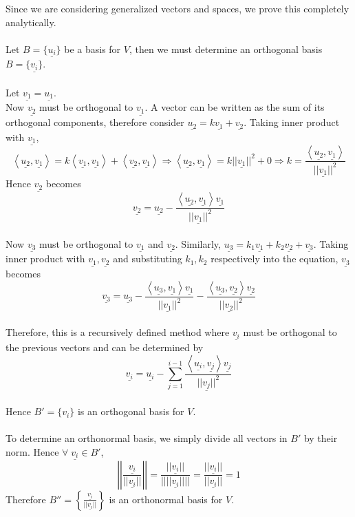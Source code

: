 \documentclass{article}
\begin{document}
\begin{tcolorbox}[colback=lightgray!20, colframe=lightgray!20, fontupper=\linespread{1.1}\selectfont]
	Since we are considering generalized vectors and spaces, we prove this completely analytically. \\\\	
	Let $B = \{\underline{u_i}\}$ be a basis for $V$, then we must determine an orthogonal basis $B = \{\underline{v_i}\}$. \\\\
	Let $\underline{v_1} = \underline{u_1}$. \\
	Now $\underline{v_2}$ must be orthogonal to $\underline{v_1}$. A vector can be written as the sum of its orthogonal components, therefore consider $\underline{u_2} = k\underline{v_1} + \underline{v_2}$. Taking inner product with $\underline{v_1}$,
	$$\left<\underline{u_2},\underline{v_1}\right> = k\left<\underline{v_1},\underline{v_1}\right> + \left<\underline{v_2},\underline{v_1}\right>
	\Rightarrow \left<\underline{u_2},\underline{v_1}\right> = k||\underline{v_1}||^2 + 0
	\Rightarrow k =  \frac{\left<\underline{u_2},\underline{v_1}\right>}{||\underline{v_1}||^2}$$
	Hence $\underline{v_2}$ becomes
	$$\underline{v_2} = \underline{u_2} - \frac{\left<\underline{u_2},\underline{v_1}\right> \underline{v_1}}{||\underline{v_1}||^2}$$ \\
	Now $\underline{v_3}$ must be orthogonal to $\underline{v_1}$ and $\underline{v_2}$. Similarly, $\underline{u_3} = k_1\underline{v_1} + k_2\underline{v_2} + \underline{v_3}$. Taking inner product with $\underline{v_1}, \underline{v_2}$ and substituting $k_1, k_2$ respectively into the equation, $\underline{v_3}$ becomes
	$$\underline{v_3} = \underline{u_3} - \frac{\left<\underline{u_3},\underline{v_1}\right> \underline{v_1}}{||\underline{v_1}||^2} - \frac{\left<\underline{u_3},\underline{v_2}\right> \underline{v_2}}{||\underline{v_2}||^2}$$ \\
	Therefore, this is a recursively defined method where $\underline{v_i}$ must be orthogonal to the previous vectors and can be determined by
	$$\underline{v_i} = \underline{u_i} - \sum_{j=1}^{i-1} \frac{\left<\underline{u_i}, \underline{v_j}\right> \underline{v_j}}{||\underline{v_j}||^2}$$ \\
	Hence $B' = \{v_i\}$ is an orthogonal basis for $V$. \\\\
	To determine an orthonormal basis, we simply divide all vectors in $B'$ by their norm. Hence $\forall \; \underline{v_i} \in B'$,
	$$\left|\left| \frac{\underline{v_i}}{||\underline{v_i}||}\right|\right| = \frac{||\underline{v_i}||}{||||\underline{v_i}||||} = \frac{||\underline{v_i}||}{||\underline{v_i}||} = 1$$
	Therefore $B'' = \left\{ \frac{\underline{v_i}}{||\underline{v_i}||}\right\}$ is an orthonormal basis for $V$.
\end{tcolorbox}
\end{document}
